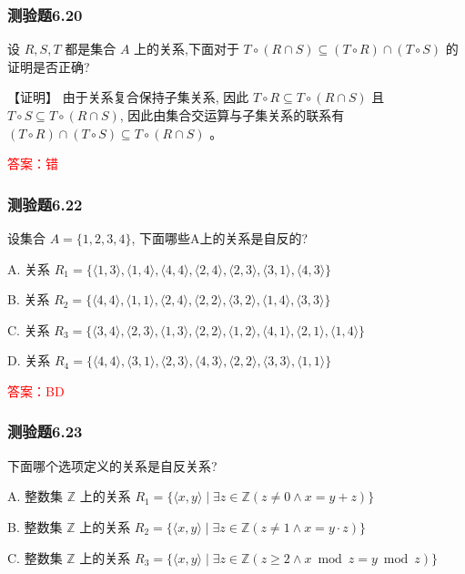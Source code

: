 \documentclass[UTF8, heading=true]{ctexart}
\begin{document}
\subsubsection{测验题6.20}
设 $R, S, T$ 都是集合 $A$ 上的关系,下面对于 $T \circ(R \cap S) \subseteq(T \circ R) \cap(T \circ S)$ 的证明是否正确?

【证明】 由于关系复合保持子集关系, 因此 $T \circ R \subseteq T \circ(R \cap S)$ 且 $T \circ S \subseteq T \circ(R \cap S)$, 因此由集合交运算与子集关系的联系有 $(T \circ R) \cap(T \circ S) \subseteq T \circ(R \cap S)$ 。

\textcolor{red}{答案：错}

\subsubsection{测验题6.22}

设集合 $A=\{1,2,3,4\}$, 下面哪些A上的关系是自反的?

A. 关系 $R_1=\{\langle 1,3\rangle,\langle 1,4\rangle,\langle 4,4\rangle,\langle 2,4\rangle,\langle 2,3\rangle,\langle 3,1\rangle,\langle 4,3\rangle\}$

B. 关系 $R_2=\{\langle 4,4\rangle,\langle 1,1\rangle,\langle 2,4\rangle,\langle 2,2\rangle,\langle 3,2\rangle,\langle 1,4\rangle,\langle 3,3\rangle\}$

C. 关系 $R_3=\{\langle 3,4\rangle,\langle 2,3\rangle,\langle 1,3\rangle,\langle 2,2\rangle,\langle 1,2\rangle,\langle 4,1\rangle,\langle 2,1\rangle,\langle 1,4\rangle\}$

D. 关系 $R_4=\{\langle 4,4\rangle,\langle 3,1\rangle,\langle 2,3\rangle,\langle 4,3\rangle,\langle 2,2\rangle,\langle 3,3\rangle,\langle 1,1\rangle\}$

\textcolor{red}{答案：BD}

\subsubsection{测验题6.23}
下面哪个选项定义的关系是自反关系?

A. 
整数集 $\mathbb{Z}$ 上的关系 $R_1=\{\langle x, y\rangle \mid \exists z \in \mathbb{Z}(z \neq 0 \wedge x=y+z)\}$

B. 
整数集 $\mathbb{Z}$ 上的关系 $R_2=\{\langle x, y\rangle \mid \exists z \in \mathbb{Z}(z \neq 1 \wedge x=y \cdot z)\}$

C. 
整数集 $\mathbb{Z}$ 上的关系 $R_3=\{\langle x, y\rangle \mid \exists z \in \mathbb{Z}(z \geq 2 \wedge x \bmod z=y \bmod z)\}$
\end{document}
